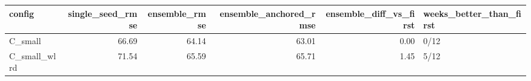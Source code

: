 \begin{tabular}{lrrrrl}
\toprule
config & single\_seed\_rmse & ensemble\_rmse & ensemble\_anchored\_rmse & ensemble\_diff\_vs\_first & weeks\_better\_than\_first \\
\midrule
C\_small & 66.69 & 64.14 & 63.01 & 0.00 & 0/12 \\
C\_small\_wlrd & 71.54 & 65.59 & 65.71 & 1.45 & 5/12 \\
\bottomrule
\end{tabular}
